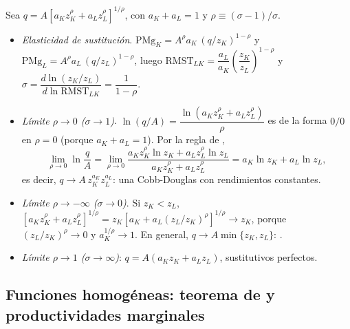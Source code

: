 \documentclass[11pt]{article}
\begin{document}
Sea $q=A\left[a_Kz_K^{\rho}+a_Lz_L^{\rho}\right]^{1/\rho}$, con $a_K+a_L=1$ y $\rho\equiv(\sigma-1)/\sigma$.
\begin{itemize}
\item \emph{Elasticidad de sustitución}. $\mathrm{PMg}_K=A^{\rho}a_K\,(q/z_K)^{1-\rho}$ y $\mathrm{PMg}_L=A^{\rho}a_L\,(q/z_L)^{1-\rho}$, luego $\mathrm{RMST}_{LK}=\dfrac{a_L}{a_K}\left(\dfrac{z_K}{z_L}\right)^{1-\rho}$ y $\sigma=\dfrac{d\ln(z_K/z_L)}{d\ln \mathrm{RMST}_{LK}}=\dfrac{1}{1-\rho}$.
\item \emph{Límite $\rho\to 0$ ($\sigma\to 1$)}. $\ln(q/A)=\dfrac{\ln\left(a_Kz_K^{\rho}+a_Lz_L^{\rho}\right)}{\rho}$ es de la forma $0/0$ en $\rho=0$ (porque $a_K+a_L=1$). Por la regla de ,
  \[
  \lim_{\rho\to 0}\ln\frac{q}{A}=\lim_{\rho\to 0}\frac{a_Kz_K^{\rho}\ln z_K+a_Lz_L^{\rho}\ln z_L}{a_Kz_K^{\rho}+a_Lz_L^{\rho}}=a_K\ln z_K+a_L\ln z_L,
  \]
  es decir, $q\to A\,z_K^{a_K}z_L^{a_L}$: una Cobb-Douglas con rendimientos constantes.
\item \emph{Límite $\rho\to-\infty$ ($\sigma\to 0$)}. Si $z_K<z_L$, $\left[a_Kz_K^{\rho}+a_Lz_L^{\rho}\right]^{1/\rho}=z_K\left[a_K+a_L(z_L/z_K)^{\rho}\right]^{1/\rho}\to z_K$, porque $(z_L/z_K)^{\rho}\to 0$ y $a_K^{1/\rho}\to 1$. En general, $q\to A\min\{z_K,z_L\}$: .
\item \emph{Límite $\rho\to 1$ ($\sigma\to\infty$)}: $q=A(a_Kz_K+a_Lz_L)$, sustitutivos perfectos.\findemo
\end{itemize}

\subsection{Funciones homogéneas: teorema de  y productividades marginales}\label{der:euler}
\end{document}
